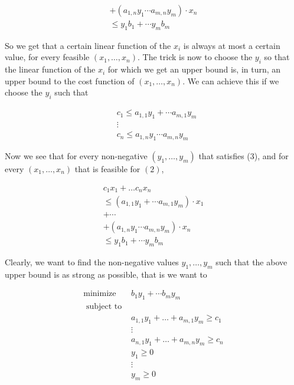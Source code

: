 

$$
\begin{gathered}
+\left(a_{1, n} y_{1} \cdots a_{m, n} y_{m}\right) \cdot x_{n} \\
\leq y_{1} b_{1}+\cdots y_{m} b_{m}
\end{gathered}
$$

So we get that a certain linear function of the $x_{i}$ is always at most a certain value, for every feasible $\left(x_{1}, \ldots, x_{n}\right)$. The trick is now to choose the $y_{i}$ so that the linear function of the $x_{i}$ for which we get an upper bound is, in turn, an upper bound to the cost function of $\left(x_{1}, \ldots, x_{n}\right)$. We can achieve this if we choose the $y_{i}$ such that

$$
\begin{aligned}
&c_{1} \leq a_{1,1} y_{1}+\cdots a_{m, 1} y_{m} \\
&\vdots \\
&c_{n} \leq a_{1, n} y_{1} \cdots a_{m, n} y_{m}
\end{aligned}
$$

Now we see that for every non-negative $\left(y_{1}, \ldots, y_{m}\right)$ that satisfies (3), and for every $\left(x_{1}, \ldots, x_{n}\right)$ that is feasible for $(2)$,

$$
\begin{gathered}
c_{1} x_{1}+\ldots c_{n} x_{n} \\
\leq\left(a_{1,1} y_{1}+\cdots a_{m, 1} y_{m}\right) \cdot x_{1} \\
+\cdots \\
+\left(a_{1, n} y_{1} \cdots a_{m, n} y_{m}\right) \cdot x_{n} \\
\leq y_{1} b_{1}+\cdots y_{m} b_{m}
\end{gathered}
$$

Clearly, we want to find the non-negative values $y_{1}, \ldots, y_{m}$ such that the above upper bound is as strong as possible, that is we want to

$$
\begin{array}{ll}
\operatorname{minimize} & b_{1} y_{1}+\cdots b_{m} y_{m} \\
\text { subject to } & \\
& a_{1,1} y_{1}+\ldots+a_{m, 1} y_{m} \geq c_{1} \\
& \vdots \\
& a_{n, 1} y_{1}+\ldots+a_{m, n} y_{m} \geq c_{n} \\
& y_{1} \geq 0 \\
& \vdots \\
& y_{m} \geq 0
\end{array}
$$

